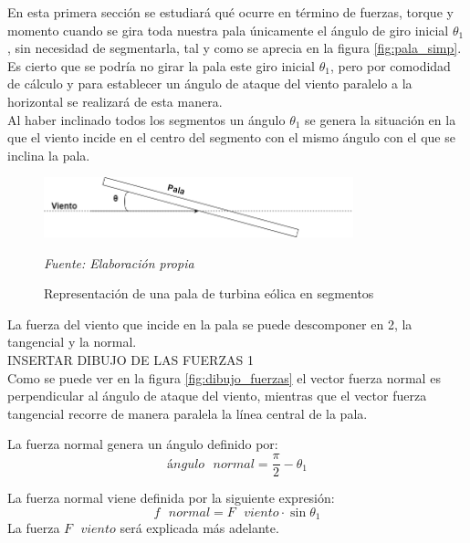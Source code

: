 En esta primera sección se estudiará qué ocurre en término de fuerzas, torque y momento cuando se gira toda nuestra pala únicamente el ángulo de giro inicial $ \theta_1 $, sin necesidad de segmentarla, tal y como se aprecia en la figura \ref{fig:pala_simp}. \\


Es cierto que se podría no girar la pala este giro inicial $ \theta_1 $, pero por comodidad de cálculo y para establecer un ángulo de ataque del viento paralelo a la horizontal se realizará de esta manera.\\


Al haber inclinado todos los segmentos un ángulo $ \theta_1 $ se genera la situación en la que el viento incide en el centro del segmento con el mismo ángulo con el que se inclina la pala. \\

    \textbf{}
    \begin{figure}[H]
    \centering
    \includegraphics[width=0.8\textwidth]{images/dibujo angulo ataque.drawio.png}
    \caption{Representación de una pala de turbina eólica en segmentos}
    \textit{Fuente: Elaboración propia}
    \label{fig:pala_dividida}
\end{figure}

La fuerza del viento que incide en la pala se puede descomponer en 2, la tangencial y la normal. \\

INSERTAR DIBUJO DE LAS FUERZAS 1 \\ 

Como se puede ver en la figura \ref{fig:dibujo_fuerzas} el vector fuerza normal es perpendicular al ángulo de ataque del viento, mientras que el vector fuerza tangencial recorre de manera paralela la línea central de la pala.

 \begin{definicion}
 La fuerza normal genera un ángulo definido por:
 $$ ángulo \text{ } normal = \dfrac{\pi}{2} - \theta_1 $$
 
 \end{definicion}

 \begin{definicion}
 La fuerza normal viene definida por la siguiente expresión:
  $$ f \text{ } normal = F \text{ } viento \cdot \sin{\theta_1}$$
   La fuerza $F \text{ } viento$ será explicada más adelante.
  \label{def:fuerza_normal_inicial}
 \end{definicion}
 
